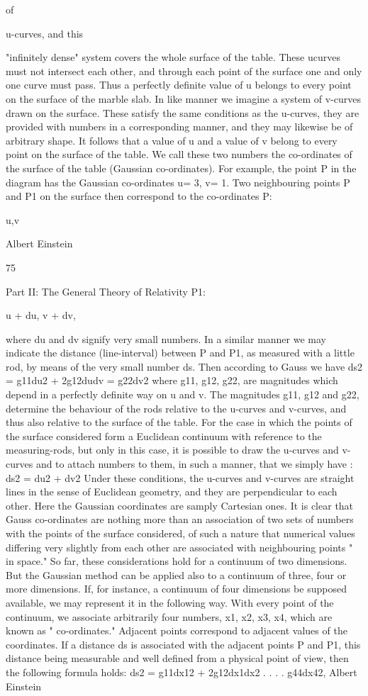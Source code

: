 \documentclass{article}
\begin{document}
of

u-curves, and this

"infinitely dense" system covers the
whole surface of the table. These ucurves must not intersect each other,
and through each point of the surface
one and only one curve must pass.
Thus a perfectly definite value of u
belongs to every point on the surface
of the marble slab. In like manner we
imagine a system of v-curves drawn
on the surface. These satisfy the same
conditions as the u-curves, they are provided with numbers in a corresponding manner, and
they may likewise be of arbitrary shape. It follows that a value of u and a value of v belong
to every point on the surface of the table. We call these two numbers the co-ordinates of the
surface of the table (Gaussian co-ordinates). For example, the point P in the diagram has the
Gaussian co-ordinates u= 3, v= 1. Two neighbouring points P and P1 on the surface then
correspond to the co-ordinates
P:

u,v

Albert Einstein

75

Part II: The General Theory of Relativity
P1:

u + du, v + dv,

where du and dv signify very small numbers. In a similar manner we may indicate the
distance (line-interval) between P and P1, as measured with a little rod, by means of the very
small number ds. Then according to Gauss we have
ds2 = g11du2 + 2g12dudv = g22dv2
where g11, g12, g22, are magnitudes which depend in a perfectly definite way on u and v. The
magnitudes g11, g12 and g22, determine the behaviour of the rods relative to the u-curves and
v-curves, and thus also relative to the surface of the table. For the case in which the points
of the surface considered form a Euclidean continuum with reference to the measuring-rods,
but only in this case, it is possible to draw the u-curves and v-curves and to attach numbers
to them, in such a manner, that we simply have :
ds2 = du2 + dv2
Under these conditions, the u-curves and v-curves are straight lines in the sense of
Euclidean geometry, and they are perpendicular to each other. Here the Gaussian
coordinates are samply Cartesian ones. It is clear that Gauss co-ordinates are nothing more
than an association of two sets of numbers with the points of the surface considered, of such
a nature that numerical values differing very slightly from each other are associated with
neighbouring points " in space."
So far, these considerations hold for a continuum of two dimensions. But the Gaussian
method can be applied also to a continuum of three, four or more dimensions. If, for
instance, a continuum of four dimensions be supposed available, we may represent it in the
following way. With every point of the continuum, we associate arbitrarily four numbers,
x1, x2, x3, x4, which are known as " co-ordinates." Adjacent points correspond to adjacent
values of the coordinates. If a distance ds is associated with the adjacent points P and P1,
this distance being measurable and well defined from a physical point of view, then the
following formula holds:
ds2 = g11dx12 + 2g12dx1dx2 . . . . g44dx42,
Albert Einstein
\end{document}
